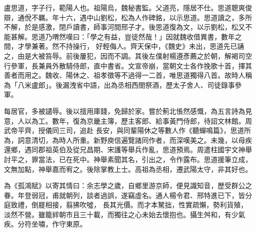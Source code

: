 
\begin{pinyinscope}

 盧思道，字子行，範陽人也。祖陽烏，魏秘書監。父道亮，隱居不仕。思道聰爽俊辯，通侻不羈。年十六，遇中山劉松，松為人作碑銘，以示思道。思道讀之，多所不解，於是感激，閉戶讀書，師事河間邢子才。後思道復為文，以示劉松，松又不能甚解。思道乃喟然嘆曰：「學之有益，豈徒然哉！」因就魏收借異書，數年之間，才學兼著。然不持操行，
 好輕侮人。齊天保中，《魏史》未出，思道先已誦之，由是大被笞辱。前後屢犯，因而不調。其後左僕射楊遵彥薦之於朝，解褐司空行參軍，長兼員外散騎侍郎，直中書省。文宣帝崩，當朝文士各作挽歌十首，擇其善者而用之。魏收、陽休之、祖孝徵等不過得一二首，唯思道獨得八首。故時人稱為「八米盧郎」。後漏洩省中語，出為丞相西閤祭酒，歷太子舍人、司徒錄事參軍。



 每居官，多被譴辱。後以擅用庫錢，免歸於家。嘗於薊北悵然感慨，為五言詩為見意，人以為工。數年，復為京畿主簿，歷主客郎、給事黃門侍郎，待詔文林館。周武帝平齊，授儀同三司，追赴
 長安，與同輩陽休之等數人作《聽蟬鳴篇》，思道所為，詞意清切，為時人所重。新野庾信遍覽諸同作者，而深嘆美之。未幾，以母疾還鄉，遇同郡祖英伯及從兄昌期、宋護等舉兵作亂，思道預焉。周遣柱國宇文神舉討平之，罪當法，已在死中。神舉素聞其名，引出之，令作露布。思道援筆立成，文無加點，神舉嘉而宥之。後除掌教上士。高祖為丞相，遷武陽太守，非其好也。



 為《孤鴻賦》以寄其情曰：余志學之歲，自鄉里游京師，便見識知音，歷受群公之眷。年登弱冠，甫就朝列，談者過誤，遂竊虛名。通人楊令君、邢特進已下，皆分庭致禮，倒屣相接，翦拂吹噓，
 長其光價。而才本駑拙，性實疏懶，勢利貨殖，淡然不營。雖籠絆朝市且三十載，而獨往之心未始去懷抱也。攝生舛和，有少氣疾。分符坐嘯，作守東原。




\end{pinyinscope}
